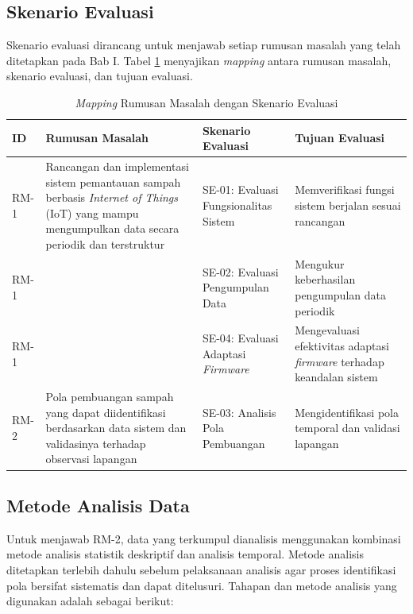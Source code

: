 \subsection{Skenario Evaluasi}

Skenario evaluasi dirancang untuk menjawab setiap rumusan masalah yang telah ditetapkan pada Bab I. Tabel \ref{tab:mapping-skenario} menyajikan \textit{mapping} antara rumusan masalah, skenario evaluasi, dan tujuan evaluasi.

\begin{table}[H]
  \caption{\textit{Mapping} Rumusan Masalah dengan Skenario Evaluasi}
  \label{tab:mapping-skenario}
  \begin{tabularx}{\textwidth}{| l | X | X | X |}
    \hline
    \textbf{ID} & \textbf{Rumusan Masalah} & \textbf{Skenario Evaluasi} & \textbf{Tujuan Evaluasi} \\
    \hline
    RM-1 & Rancangan dan implementasi sistem pemantauan sampah berbasis \textit{Internet of Things} (IoT) yang mampu mengumpulkan data secara periodik dan terstruktur & SE-01: Evaluasi Fungsionalitas Sistem & Memverifikasi fungsi sistem berjalan sesuai rancangan \\
    \hline
    RM-1 & & SE-02: Evaluasi Pengumpulan Data & Mengukur keberhasilan pengumpulan data periodik \\
    \hline
    RM-1 & & SE-04: Evaluasi Adaptasi \textit{Firmware} & Mengevaluasi efektivitas adaptasi \textit{firmware} terhadap keandalan sistem \\
    \hline
    RM-2 & Pola pembuangan sampah yang dapat diidentifikasi berdasarkan data sistem dan validasinya terhadap observasi lapangan & SE-03: Analisis Pola Pembuangan & Mengidentifikasi pola temporal dan validasi lapangan \\
    \hline
  \end{tabularx}
\end{table}

\subsection{Metode Analisis Data}
\label{sec:metode-analisis-data}

Untuk menjawab RM-2, data yang terkumpul dianalisis menggunakan kombinasi metode analisis statistik deskriptif dan analisis temporal. Metode analisis ditetapkan terlebih dahulu sebelum pelaksanaan analisis agar proses identifikasi pola bersifat sistematis dan dapat ditelusuri. Tahapan dan metode analisis yang digunakan adalah sebagai berikut:


